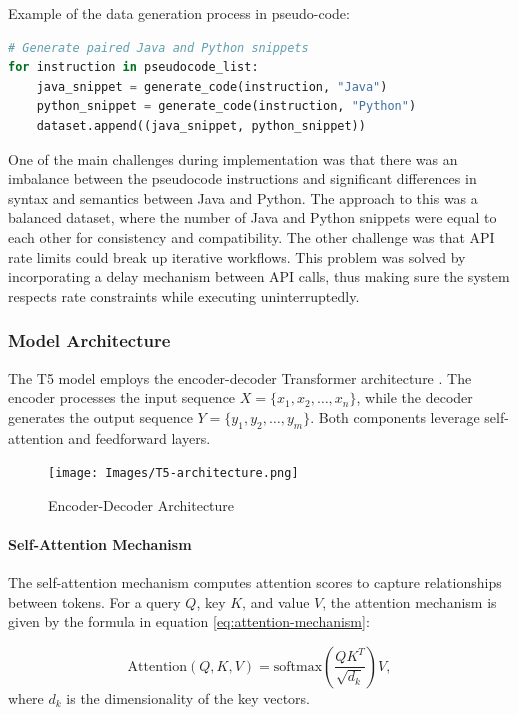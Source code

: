 \documentclass{dhbenelux}
\begin{document}
\noindent Example of the data generation process in pseudo-code:
\begin{lstlisting}[language=Python, caption={Pseudocode for Dataset Preparation}]
# Generate paired Java and Python snippets
for instruction in pseudocode_list:
    java_snippet = generate_code(instruction, "Java")
    python_snippet = generate_code(instruction, "Python")
    dataset.append((java_snippet, python_snippet))
\end{lstlisting}

One of the main challenges during implementation was that there was an imbalance between the pseudocode instructions and significant differences in syntax and semantics between Java and Python. The approach to this was a balanced dataset, where the number of Java and Python snippets were equal to each other for consistency and compatibility. The other challenge was that API rate limits could break up iterative workflows. This problem was solved by incorporating a delay mechanism between API calls, thus making sure the system respects rate constraints while executing uninterruptedly.
\subsubsection{Model Architecture}
The T5 model employs the encoder-decoder Transformer architecture \cite{kyle2021}. The encoder processes the input sequence $X = \{x_1, x_2, \dots, x_n\}$, while the decoder generates the output sequence $Y = \{y_1, y_2, \dots, y_m\}$. Both components leverage self-attention and feedforward layers.

\begin{figure}[h]
\centering
\texttt{[image: Images/T5-architecture.png]}
\caption{Encoder-Decoder Architecture}
\label{fig:encoder-decoder-architecture}
\end{figure}

\paragraph{Self-Attention Mechanism}
The self-attention mechanism computes attention scores to capture relationships between tokens. For a query \(Q\), key \(K\), and value \(V\), the attention mechanism is given by the formula in equation \ref{eq:attention-mechanism}:

\begin{equation}
\text{Attention}(Q, K, V) = \text{softmax}\left(\frac{QK^T}{\sqrt{d_k}}\right)V,
\label{eq:attention-mechanism}
\end{equation}
where \(d_k\) is the dimensionality of the key vectors.
\end{document}
